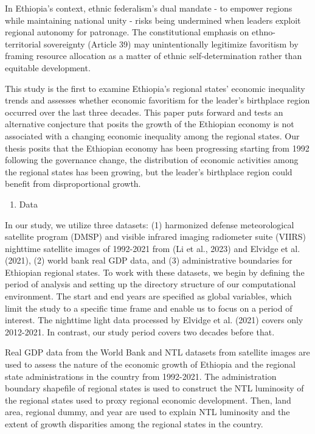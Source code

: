 In Ethiopia's context, ethnic federalism's dual mandate - to empower
regions while maintaining national unity - risks being undermined when
leaders exploit regional autonomy for patronage. The constitutional
emphasis on ethno-territorial sovereignty (Article 39) may
unintentionally legitimize favoritism by framing resource allocation as
a matter of ethnic self-determination rather than equitable development.

This study is the first to examine Ethiopia's regional states' economic
inequality trends and assesses whether economic favoritism for the
leader's birthplace region occurred over the last three decades. This
paper puts forward and tests an alternative conjecture that posits the
growth of the Ethiopian economy is not associated with a changing
economic inequality among the regional states. Our thesis posits that
the Ethiopian economy has been progressing starting from 1992 following
the governance change, the distribution of economic activities among the
regional states has been growing, but the leader's birthplace region
could benefit from disproportional growth.

\begin{enumerate}
\def\labelenumi{\arabic{enumi}.}
\setcounter{enumi}{1}
\item
  Data
\end{enumerate}

In our study, we utilize three datasets: (1) harmonized defense
meteorological satellite program (DMSP) and visible infrared imaging
radiometer suite (VIIRS) nighttime satellite images of 1992-2021 from
(Li et al., 2023) and Elvidge et al. (2021), (2) world bank real GDP
data, and (3) administrative boundaries for Ethiopian regional states.
To work with these datasets, we begin by defining the period of analysis
and setting up the directory structure of our computational environment.
The start and end years are specified as global variables, which limit
the study to a specific time frame and enable us to focus on a period of
interest. The nighttime light data processed by Elvidge et al. (2021)
covers only 2012-2021. In contrast, our study period covers two decades
before that.

Real GDP data from the World Bank and NTL datasets from satellite images
are used to assess the nature of the economic growth of Ethiopia and the
regional state administrations in the country from 1992-2021. The
administration boundary shapefile of regional states is used to
construct the NTL luminosity of the regional states used to proxy
regional economic development. Then, land area, regional dummy, and year
are used to explain NTL luminosity and the extent of growth disparities
among the regional states in the country.

